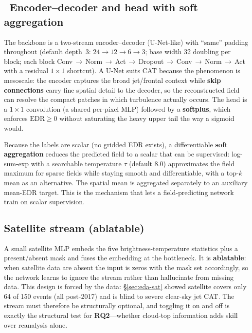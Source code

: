 \documentclass[11pt]{article}
\newcommand{\circnum}[1]{\ding{\the\numexpr181+#1\relax}}
\begin{document}
\subsection{\circnum{3}\,\circnum{5} Encoder--decoder and \circnum{6} head with soft aggregation}
\label{sec:arch-unet}
The backbone is a two-stream encoder--decoder (U-Net-like) with
``same'' padding throughout (default depth~3:
$24\!\to\!12\!\to\!6\!\to\!3$; base width 32 doubling per block; each
block Conv\,$\to$\,Norm\,$\to$\,Act\,$\to$\,Dropout\,$\to$\,Conv\,$\to$\,Norm\,$\to$\,Act
with a residual $1\times1$ shortcut). A U-Net suits CAT because the
phenomenon is mesoscale: the encoder captures the broad jet/frontal
context while \textbf{skip connections} carry fine spatial detail to the
decoder, so the reconstructed field can resolve the compact patches in
which turbulence actually occurs. The \circnum{6} head is a $1\times1$
convolution (a shared per-pixel MLP) followed by a \textbf{softplus},
which enforces $\mathrm{EDR}\geq 0$ without saturating the heavy upper
tail the way a sigmoid would.

Because the labels are scalar (no gridded EDR exists), a differentiable
\textbf{soft aggregation} reduces the predicted field to a scalar that can
be supervised: log-sum-exp with a searchable temperature $\tau$ (default
8.0) approximates the field maximum for sparse fields while staying
smooth and differentiable, with a top-$k$ mean as an alternative. The
spatial mean is aggregated separately to an auxiliary mean-EDR target.
This is the mechanism that lets a field-predicting network train on
scalar supervision.

\subsection{\circnum{4} Satellite stream (ablatable)}
\label{sec:arch-sat}
A small satellite MLP embeds the five brightness-temperature statistics
plus a present/absent mask and fuses the embedding at the bottleneck. It
is \textbf{ablatable}: when satellite data are absent the input is zeros
with the mask set accordingly, so the network learns to ignore the stream
rather than hallucinate from missing data. This design is forced by the
data: \S\ref{sec:eda-sat} showed satellite covers only 64 of 150 events
(all post-2017) and is blind to severe clear-sky jet CAT. The stream must
therefore be structurally optional, and toggling it on and off is exactly
the structural test for \textbf{RQ2}---whether cloud-top information adds
skill over reanalysis alone.
\end{document}
